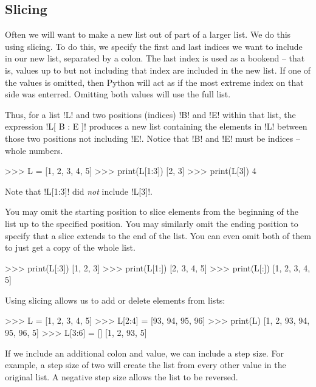 \documentclass[11pt]{cselabheader}
\begin{document}
\subsection{Slicing}
Often we will want to make a new list out of part of a larger list. We do this
using slicing. To do this, we specify the first and last indices we want to
include in our new list, separated by a colon. The last index is used as a
bookend -- that is, values up to but not including that index are included in
the new list. If one of the values is omitted, then Python will act as if the
most extreme index on that side was enterred. Omitting both values will use the
full list.

Thus, for a list \pythoninline!L! and two positions (indices) \pythoninline!B! and
\pythoninline!E! within that list, the expression \pythoninline!L[ B : E ]! produces a
new list containing the elements in \pythoninline!L! between those two positions
not including \pythoninline!E!. Notice that \pythoninline!B! and \pythoninline!E! must be
indices -- whole numbers.

\begin{pyconcode}
>>> L = [1, 2, 3, 4, 5]
>>> print(L[1:3])
[2, 3]
>>> print(L[3])
4
\end{pyconcode}

Note that \pythoninline!L[1:3]! did \emph{not} include \pythoninline!L[3]!. 

You may omit the starting position to slice elements from the beginning of the
list up to the specified position. You may similarly omit the ending position to
specify that a slice extends to the end of the list. You can even omit both of
them to just get a copy of the whole list.

\begin{pyconcode}
>>> print(L[:3])
[1, 2, 3]
>>> print(L[1:])
[2, 3, 4, 5]
>>> print(L[:])
[1, 2, 3, 4, 5]
\end{pyconcode}

Using slicing allows us to add or delete elements from lists:

\begin{pyconcode}
>>> L = [1, 2, 3, 4, 5]
>>> L[2:4] = [93, 94, 95, 96]
>>> print(L)
[1, 2, 93, 94, 95, 96, 5]
>>> L[3:6] = []
[1, 2, 93, 5]
\end{pyconcode}

If we include an additional colon and value, we can include a step size. For
example, a step size of two will create the list from every other value in the
original list. A negative step size allows the list to be reversed.
\end{document}
